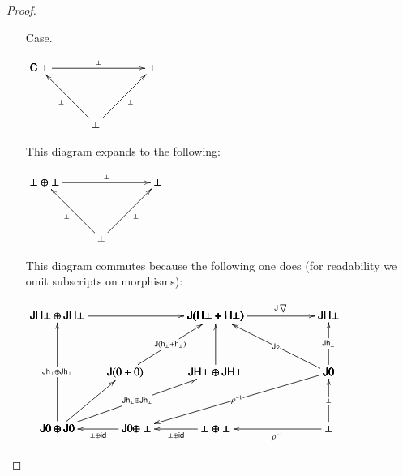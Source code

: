 \documentclass{lmcs}
\let\t\relax
\let\r\relax
\let\c\relax
\let\j\relax
\let\wn\relax
\newcommand{\func}[1]{\mathsf{#1}}
\newcommand{\id}[0]{\mathsf{id}}
\newcommand{\h}[1]{\mathsf{h}_{#1}}
\newcommand{\t}[0]{\mathsf{t}}
\newcommand{\r}[1]{\mathsf{r}_{#1}}
\newcommand{\c}[1]{\mathsf{c}_{#1}}
\newcommand{\j}[1]{\mathsf{j}_{#1}}
\newcommand{\wn}[0]{\mathop{?}}
\newcommand{\codiag}[1]{\bigtriangledown_{#1}}
\newenvironment{diagram}{
  \begin{center}
    \begin{math}
      \bfig
}{
      \efig
    \end{math}
  \end{center}
}
\begin{document}
\begin{proof}
\begin{itemize}
\begin{itemize}
    \item[Case.] \ \\
      \begin{diagram}
        \Vtriangle/->`<-`<-/[
          \func{C}\perp`
          \wn \perp`
          \perp;
          \c{\perp}`
          \t{\perp}`
          \r{\perp}]
      \end{diagram}
      This diagram expands to the following:
      \begin{diagram}
        \Vtriangle/->`<-`<-/[
          \wn \perp \oplus \wn \perp`
          \wn \perp`
          \perp;
          \c{\perp}`
          \t{\perp}`
          \r{\perp}]
      \end{diagram}
      This diagram commutes because the following one does (for
      readability we omit subscripts on morphisms):
      \begin{diagram}
        \square|ammb|/``<-`<-/<1000,500>[`
          \func{J}0`
          \perp \oplus \perp`
          \perp;``
          \j{\perp}`
          \rho^{-1}]
        \square(0,500)|ammb|/->``<-`/<1000,500>[
          \func{J}(\func{H}{\perp} + \func{H}{\perp})`
          \func{JH}{\perp}``
          \func{J}0;
          \func{J}\codiag{}``
          \func{J}\h{\perp}`]
        \morphism(-700,0)|b|/<-/<700,0>[
          \func{J}{0} \oplus \perp`
          \perp \oplus \perp;
          \j{\perp} \oplus \id]
        \morphism(-1400,0)|b|/<-/<700,0>[
          \func{J}0 \oplus \func{J}0`
          \func{J}{0} \oplus \perp;
          \j{\perp} \oplus \id]
        \square(-1400,0)|amma|/->`<-``/<1400,1000>[
          \func{JH}{\perp} \oplus \func{JH}{\perp}`
          \func{J}(\func{H}{\perp} + \func{H}{\perp})`
          \func{J}0 \oplus \func{J}0`;
          \j{}`
          \func{J}\h{\perp} \oplus \func{J}\h{\perp}``]
        \morphism(1000,500)|m|/->/<-1701,-500>[
          \func{J}0`
          \func{J}{0} \oplus \perp;
          \rho^{-1}]
        \morphism(1000,500)|m|/->/<-1000,500>[
          \func{J}0`
          \func{J}(\func{H}{\perp} + \func{H}{\perp});
          \func{J}\diamond]
        \morphism(-1400,0)|m|/->/<1400,500>[
          \func{J}0 \oplus \func{J}0`
          \func{JH}{\perp} \oplus \func{JH}{\perp};
          \func{J}\h{\perp} \oplus \func{J}\h{\perp}]
        \morphism(-0,500)|m|/->/<0,500>[
          \func{JH}{\perp} \oplus \func{JH}{\perp}`
          \func{J}(\func{H}{\perp} + \func{H}{\perp});
          \j{}]         
        \morphism(-1400,0)|m|/->/<600,500>[
          \func{J}0 \oplus \func{J}0`
          \func{J}(0 + 0);
          \j{}]
        \morphism(-800,500)|m|/->/<800,500>[
          \func{J}(0 + 0)`
          \func{J}(\func{H}{\perp} + \func{H}{\perp});
          \func{J}(\h{\perp} + \h{\perp})]


\end{diagram}
\end{itemize}
\end{itemize}
\end{proof}
\end{document}
